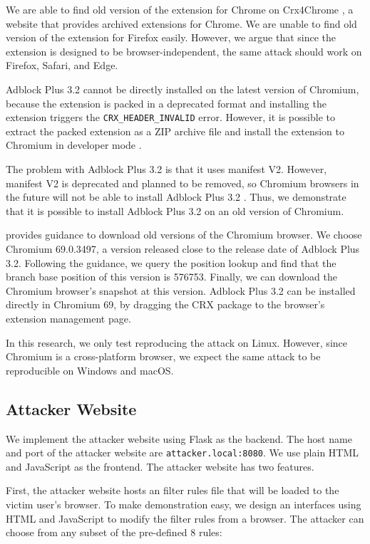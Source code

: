 \documentclass[conference]{IEEEtran}
\begin{document}
We are able to find old version of the extension for Chrome on Crx4Chrome \cite{cr4chrome_abp}, a website that provides archived extensions for Chrome. We are unable to find old version of the extension for Firefox easily. However, we argue that since the extension is designed to be browser-independent, the same attack should work on Firefox, Safari, and Edge.

Adblock Plus 3.2 cannot be directly installed on the latest version of Chromium, because the extension is packed in a deprecated format and installing the extension triggers the \lstinline{CRX_HEADER_INVALID} error. However, it is possible to extract the packed extension as a ZIP archive file and install the extension to Chromium in developer mode \cite{stackoverflow_crx_header_invalid}.

The problem with Adblock Plus 3.2 is that it uses manifest V2. However, manifest V2 is deprecated and planned to be removed, so Chromium browsers in the future will not be able to install Adblock Plus 3.2 \cite{chrome_manifest_v2}. Thus, we demonstrate that it is possible to install Adblock Plus 3.2 on an old version of Chromium.

\cite{chromium_old_download} provides guidance to download old versions of the Chromium browser. We choose Chromium 69.0.3497, a version released close to the release date of Adblock Plus 3.2.
Following the guidance, we query the position lookup and find that the branch base position of this version is 576753. Finally, we can download the Chromium browser's snapshot at this version. Adblock Plus 3.2 can be installed directly in Chromium 69, by dragging the CRX package to the browser's extension management page.

In this research, we only test reproducing the attack on Linux. However, since Chromium is a cross-platform browser, we expect the same attack to be reproducible on Windows and macOS.

\subsection{Attacker Website}

We implement the attacker website using Flask as the backend. The host name and port of the attacker website are \lstinline{attacker.local:8080}. We use plain HTML and JavaScript as the frontend. The attacker website has two features.

First, the attacker website hosts an filter rules file that will be loaded to the victim user's browser. To make demonstration easy, we design an interfaces using HTML and JavaScript to modify the filter rules from a browser. The attacker can choose from any subset of the pre-defined 8 rules:
\end{document}
